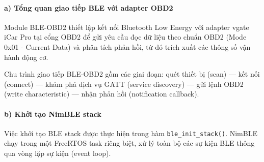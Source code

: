 \documentclass[a4paper]{extarticle}
\begin{document}
\paragraph{a) Tổng quan giao tiếp BLE với adapter
OBD2}\label{a-tux1ed5ng-quan-giao-tiux1ebfp-ble-vux1edbi-adapter-obd2}

Module BLE-OBD2 thiết lập kết nối Bluetooth Low Energy với adapter vgate
iCar Pro tại cổng OBD2 để gửi yêu cầu đọc dữ liệu theo chuẩn OBD2 (Mode
0x01 - Current Data) và phân tích phản hồi, từ đó trích xuất các thông
số vận hành động cơ.

Chu trình giao tiếp BLE-OBD2 gồm các giai đoạn: quét thiết bị (scan) ---
kết nối (connect) --- khám phá dịch vụ GATT (service discovery) --- gửi
lệnh OBD2 (write characteristic) --- nhận phản hồi (notification
callback).

\paragraph{b) Khởi tạo NimBLE
stack}\label{b-khux1edfi-tux1ea1o-nimble-stack}

Việc khởi tạo BLE stack được thực hiện trong hàm
\texttt{ble\_init\_stack()}. NimBLE chạy trong một FreeRTOS task riêng
biệt, xử lý toàn bộ các sự kiện BLE thông qua vòng lặp sự kiện (event
loop).
\end{document}
